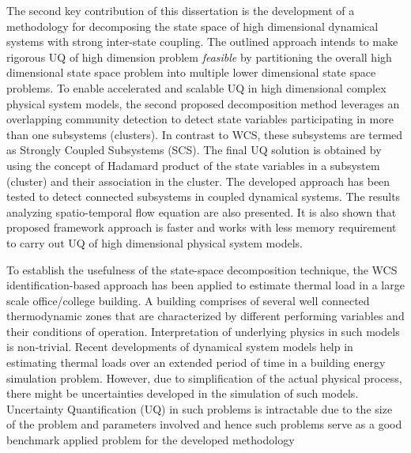 The second key contribution of this dissertation is the development of a methodology for decomposing the state space of high dimensional dynamical systems with strong inter-state coupling. The outlined approach intends to make rigorous UQ of high dimension problem \textit{feasible} by partitioning the overall high dimensional state space problem into multiple lower dimensional state space problems. To enable accelerated and scalable UQ in high dimensional complex physical system models, the second proposed decomposition method leverages an overlapping community detection to detect state variables participating in more than one subsystems (clusters). In contrast to WCS, these subsystems are termed as Strongly Coupled Subsystems (SCS). The final UQ solution is obtained by using the concept of Hadamard product of the state variables in a subsystem (cluster) and their association in the cluster. The developed approach has been tested to detect connected subsystems in coupled dynamical systems. The results analyzing spatio-temporal flow equation are also presented. It is also shown that proposed framework approach is faster and works with less memory requirement to carry out UQ of high dimensional physical system models. 
	
To establish the usefulness of the state-space decomposition technique, the WCS identification-based approach has been applied to estimate thermal load in a large scale office/college building. A building comprises of several well connected thermodynamic zones that are characterized by different performing variables and their conditions of operation. Interpretation of underlying physics in such models is non-trivial. Recent developments of dynamical system models help in estimating thermal loads over an extended period of time in a building energy simulation problem. However, due to simplification of the actual physical process, there might be uncertainties developed in the simulation of such models. Uncertainty Quantification (UQ) in such problems is intractable due to the size of the problem and parameters involved and hence such problems serve as a good benchmark applied problem for the developed methodology

